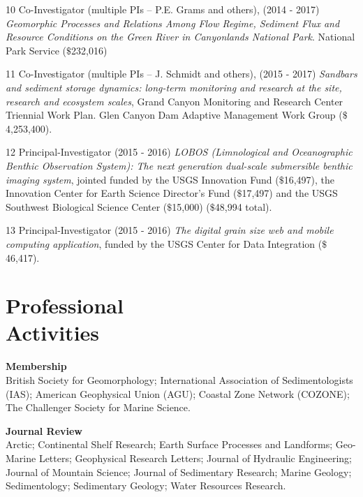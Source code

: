 \documentclass[margin,line]{resume}
\begin{document}
\begin{resume}
\begin{footnotesize}
\begin{list1}
	\item[10] Co-Investigator (multiple PIs – P.E. Grams and others), (2014 - 2017) {\sl Geomorphic Processes and Relations Among Flow Regime, Sediment Flux and Resource Conditions on the Green River in Canyonlands National Park}. National Park Service ($\$$232,016)\\

	\item[11] Co-Investigator (multiple PIs – J. Schmidt and others), (2015 - 2017) {\sl Sandbars and sediment storage dynamics: long-term monitoring and research at the site, research and ecosystem scales}, Grand Canyon Monitoring and Research Center Triennial Work Plan. Glen Canyon Dam Adaptive Management Work Group ($\$$4,253,400).\\

	\item[12] Principal-Investigator (2015 - 2016) {\sl LOBOS (Limnological and Oceanographic Benthic Observation System): The next generation dual-scale submersible benthic imaging system}, jointed funded by the USGS Innovation Fund ($\$$16,497), the Innovation Center for Earth Science Director's Fund ($\$$17,497) and the USGS Southwest Biological Science Center ($\$$15,000) ($\$$48,994 total).\\

	\item[13] Principal-Investigator (2015 - 2016) {\sl The digital grain size web and mobile computing application}, funded by the USGS Center for Data Integration ($\$$46,417).

	\end{list1}
        \end{footnotesize}

    \section{\mysidestyle Professional \\Activities}
    \begin{footnotesize} 
    {\bf Membership}\\
    British Society for Geomorphology; International Association of Sedimentologists (IAS); American Geophysical Union (AGU); Coastal Zone Network (COZONE); The Challenger Society for Marine Science.

    {\bf Journal Review} \\
 	Arctic; Continental Shelf Research; Earth Surface Processes and Landforms; Geo-Marine Letters; Geophysical Research Letters; Journal of Hydraulic Engineering; Journal of Mountain Science; Journal of Sedimentary Research; Marine Geology; Sedimentology; Sedimentary Geology; Water Resources Research.
     \end{footnotesize}


\end{resume}
\end{document}
